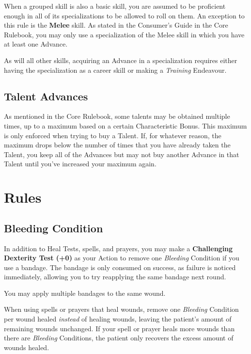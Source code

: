 \documentclass[parskip=full,11pt]{wfrp-short}
\begin{document}
When a grouped skill is also a basic skill, you are assumed to be proficient
enough in all of its specializations to be allowed to roll on them.
An exception to this rule is the \textbf{Melee} skill.
As stated in the Consumer's Guide in the Core Rulebook, you may only use a
specialization of the Melee skill in which you have at least one Advance.

As will all other skills, acquiring an Advance in a specialization requires
either having the specialization as a career skill or making a
\textit{Training} Endeavour.

\subsection{Talent Advances}
As mentioned in the Core Rulebook, some talents may be obtained multiple times,
up to a maximum based on a certain Characteristic Bonus.
This maximum is only enforced when trying to buy a Talent.
If, for whatever reason, the maximum drops below the number of times that you
have already taken the Talent, you keep all of the Advances but may not buy
another Advance in that Talent until you've increased your maximum again.

\section{Rules}

\subsection{Bleeding Condition}
In addition to Heal Tests, spells, and prayers, you may make a
\textbf{Challenging Dexterity Test (+0)} as your Action to remove one
\textit{Bleeding} Condition if you use a bandage.
The bandage is only consumed on success, as failure is noticed immediately,
allowing you to try reapplying the same bandage next round.

You may apply multiple bandages to the same wound.

When using spells or prayers that heal wounds, remove one \textit{Bleeding}
Condition per wound healed \textit{instead} of healing wounds, leaving the
patient's amount of remaining wounds unchanged.
If your spell or prayer heals more wounds than there are \textit{Bleeding}
Conditions, the patient only recovers the excess amount of
wounds healed.
\end{document}
